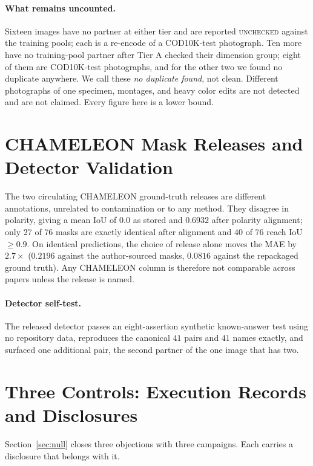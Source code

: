 \documentclass{article}
\newif\ifrevmarked \revmarkedtrue
\DeclareRobustCommand{\revC}[1]{\ifrevmarked{\color{RevC}#1}\else{#1}\fi}
\begin{document}
\paragraph{What remains uncounted.} Sixteen images have no partner at either tier and are reported
\textsc{unchecked} \revC{against the training pools; each is a re-encode of a COD10K-test photograph. Ten more have no
training-pool partner after Tier A checked their dimension group; eight of them are COD10K-test photographs, and for
the other two we found no duplicate anywhere. We call these \emph{no duplicate found}}, not clean. Different photographs of one specimen, montages, and heavy color edits
are not detected and are not claimed. Every figure here is a lower bound.


\section{CHAMELEON Mask Releases and Detector Validation}
\label{app:masks}

The two circulating CHAMELEON ground-truth releases are different annotations, unrelated to
contamination or to any method. They disagree in polarity, giving a mean IoU of $0.0$ as stored and
$0.6932$ after polarity alignment; only $27$ of $76$ masks are exactly identical after alignment and
$40$ of $76$ reach IoU $\geq 0.9$. On identical predictions, the choice of release alone moves the MAE by
$2.7\times$ ($0.2196$ against the author-sourced masks, $0.0816$ against the repackaged ground truth).
Any CHAMELEON column is therefore not comparable across papers unless the release is named.

\paragraph{Detector self-test.} The released detector passes an eight-assertion synthetic
known-answer test using no repository data, reproduces the canonical $41$ pairs and $41$ names exactly, and surfaced one additional pair, the second partner of the one image that has two.

\section{Three Controls: Execution Records and Disclosures}
\label{app:controls}

Section~\ref{sec:null} closes three objections with three campaigns. Each carries a disclosure that
belongs with it.
\end{document}
